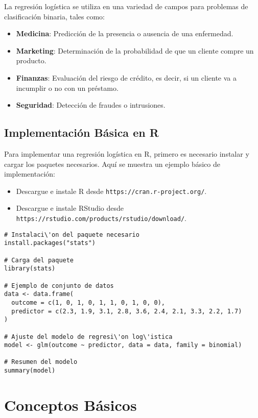 \documentclass[a4paper]{report} %
\begin{document}
La regresi\'on log\'istica se utiliza en una variedad de campos para problemas de clasificaci\'on binaria, tales como:
\begin{itemize}
    \item \textbf{Medicina}: Predicci\'on de la presencia o ausencia de una enfermedad.
    \item \textbf{Marketing}: Determinaci\'on de la probabilidad de que un cliente compre un producto.
    \item \textbf{Finanzas}: Evaluaci\'on del riesgo de cr\'edito, es decir, si un cliente va a incumplir o no con un pr\'estamo.
    \item \textbf{Seguridad}: Detecci\'on de fraudes o intrusiones.
\end{itemize}

\subsection{Implementaci\'on B\'asica en R}

Para implementar una regresi\'on log\'istica en R, primero es necesario instalar y cargar los paquetes necesarios. Aqu\'i se muestra un ejemplo b\'asico de implementaci\'on:

\begin{itemize}
    \item Descargue e instale R desde \texttt{https://cran.r-project.org/}.
    \item Descargue e instale RStudio desde \texttt{https://rstudio.com/products/rstudio/download/}.
\end{itemize}

\begin{verbatim}
# Instalaci\'on del paquete necesario
install.packages("stats")

# Carga del paquete
library(stats)

# Ejemplo de conjunto de datos
data <- data.frame(
  outcome = c(1, 0, 1, 0, 1, 1, 0, 1, 0, 0),
  predictor = c(2.3, 1.9, 3.1, 2.8, 3.6, 2.4, 2.1, 3.3, 2.2, 1.7)
)

# Ajuste del modelo de regresi\'on log\'istica
model <- glm(outcome ~ predictor, data = data, family = binomial)

# Resumen del modelo
summary(model)
\end{verbatim}

\section{Conceptos B\'asicos}
\end{document}
